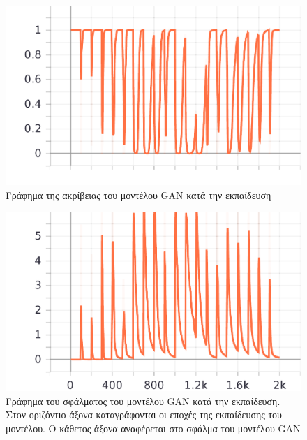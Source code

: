 \begin{figure}[H]
  \centering
  \includegraphics{../images/graphs/epoch_accuracy.png}
  \caption{Γράφημα της ακρίβειας του μοντέλου GAN κατά την εκπαίδευση}
\end{figure}

\begin{figure}[H]
  \centering
  \includegraphics{../images/graphs/epoch_loss.png}
  \caption{Γράφημα του σφάλματος του μοντέλου GAN κατά την εκπαίδευση. Στον οριζόντιο άξονα καταγράφονται οι εποχές της εκπαίδευσης του μοντέλου. Ο κάθετος άξονα αναφέρεται στο σφάλμα του μοντέλου GAN}
\end{figure}

